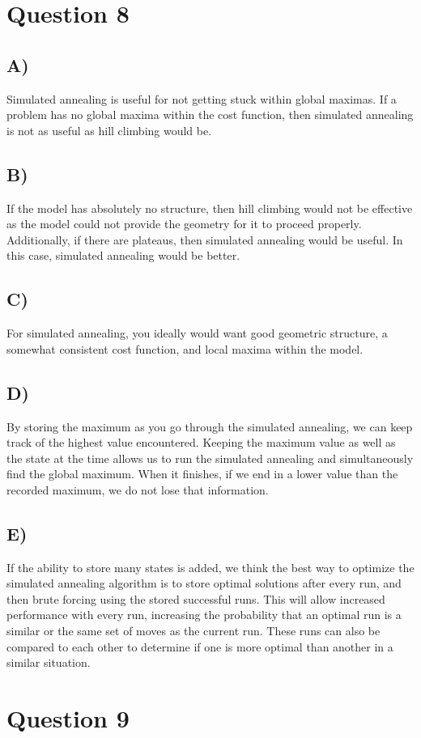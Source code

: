 \documentclass{article}
\begin{document}
\section*{Question 8}
	\subsection*{A)}
Simulated annealing is useful for not getting stuck within global maximas. If a problem has no global maxima within the cost function, then simulated annealing is not as useful as hill climbing would be.
	\subsection*{B)}
If the model has absolutely no structure, then hill climbing would not be effective as the model could not provide the geometry for it to proceed properly. Additionally, if there are plateaus, then simulated annealing would be useful. In this case, simulated annealing would be better.
	\subsection*{C)}
For simulated annealing, you ideally would want good geometric structure, a somewhat consistent cost function, and local maxima within the model. 
	\subsection*{D)}
By storing the maximum as you go through the simulated annealing, we can keep track of the highest value encountered. Keeping the maximum value as well as the state at the time allows us to run the simulated annealing and simultaneously find the global maximum. When it finishes, if we end in a lower value than the recorded maximum, we do not lose that information.
	\subsection*{E)}
If the ability to store many states is added, we think the best way to optimize the simulated annealing algorithm is to store optimal solutions after every run, and then brute forcing using the stored successful runs. This will allow increased performance with every run, increasing the probability that an optimal run is a similar or the same set of moves as the current run. These runs can also be compared to each other to determine if one is more optimal than another in a similar situation.
\section*{Question 9}
\end{document}
